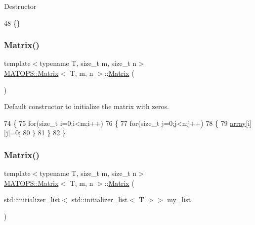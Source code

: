 Destructor 
\begin{DoxyCode}
48 \{\}
\end{DoxyCode}
\mbox{\label{classMATOPS_1_1Matrix_ab714719c18d79c8d0480d0665ff56609}} 
\subsubsection{\texorpdfstring{Matrix()}{Matrix()}\hspace{0.1cm}{\footnotesize\ttfamily [1/3]}}
{\footnotesize\ttfamily template$<$typename T, size\+\_\+t m, size\+\_\+t n$>$ \\
\hyperlink{classMATOPS_1_1Matrix}{M\+A\+T\+O\+P\+S\+::\+Matrix}$<$ T, m, n $>$\+::\hyperlink{classMATOPS_1_1Matrix}{Matrix} (\begin{DoxyParamCaption}{ }\end{DoxyParamCaption})\hspace{0.3cm}{\ttfamily [inline]}}



Default constructor to initialize the matrix with zeros. 


\begin{DoxyCode}
74                         \{
75                                 \textcolor{keywordflow}{for}(\textcolor{keywordtype}{size\_t} i=0;i<m;i++)
76                                 \{
77                                         \textcolor{keywordflow}{for}(\textcolor{keywordtype}{size\_t} j=0;j<n;j++)
78                                         \{
79                                                 \hyperlink{classMATOPS_1_1Matrix_af2a995c9d251f109d54040e2732a93f0}{array}[i][j]=0;
80                                         \}
81                                 \}
82                         \}
\end{DoxyCode}
\mbox{\label{classMATOPS_1_1Matrix_ab665ea80cebcf2656c51dac5a86efd7b}} 
\subsubsection{\texorpdfstring{Matrix()}{Matrix()}\hspace{0.1cm}{\footnotesize\ttfamily [2/3]}}
{\footnotesize\ttfamily template$<$typename T, size\+\_\+t m, size\+\_\+t n$>$ \\
\hyperlink{classMATOPS_1_1Matrix}{M\+A\+T\+O\+P\+S\+::\+Matrix}$<$ T, m, n $>$\+::\hyperlink{classMATOPS_1_1Matrix}{Matrix} (\begin{DoxyParamCaption}\item[{std\+::initializer\+\_\+list$<$ std\+::initializer\+\_\+list$<$ T $>$$>$}]{my\+\_\+list }\end{DoxyParamCaption})\hspace{0.3cm}{\ttfamily [inline]}}



